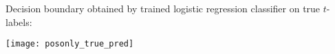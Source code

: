 \begin{answer}
\graphicspath{ {./posonly/} }
	Decision boundary obtained by trained logistic regression classifier on true $t$-labels:

\texttt{[image: posonly\_true\_pred]}

\end{answer}
